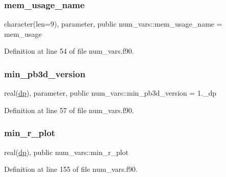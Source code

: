 \subsubsection{\texorpdfstring{mem\+\_\+usage\+\_\+name}{mem\_usage\_name}}
{\footnotesize\ttfamily character(len=9), parameter, public num\+\_\+vars\+::mem\+\_\+usage\+\_\+name = \textquotesingle{}mem\+\_\+usage\textquotesingle{}}



Definition at line 54 of file num\+\_\+vars.\+f90.

\mbox{\label{namespacenum__vars_a7188b02fe090f6e8891fdd26f604284f}} 
\subsubsection{\texorpdfstring{min\+\_\+pb3d\+\_\+version}{min\_pb3d\_version}}
{\footnotesize\ttfamily real(\hyperlink{namespacenum__vars_a03802aa2bd86439d7a9370836fabf3f2}{dp}), parameter, public num\+\_\+vars\+::min\+\_\+pb3d\+\_\+version = 1.\+\_\+dp}



Definition at line 57 of file num\+\_\+vars.\+f90.

\mbox{\label{namespacenum__vars_ab3369f21aa4433cb6dc08957e477c015}} 
\subsubsection{\texorpdfstring{min\+\_\+r\+\_\+plot}{min\_r\_plot}}
{\footnotesize\ttfamily real(\hyperlink{namespacenum__vars_a03802aa2bd86439d7a9370836fabf3f2}{dp}), public num\+\_\+vars\+::min\+\_\+r\+\_\+plot}



Definition at line 155 of file num\+\_\+vars.\+f90.

\mbox{\label{namespacenum__vars_a2085f22558c1b4a349b5ad1b6abfe09f}} 
